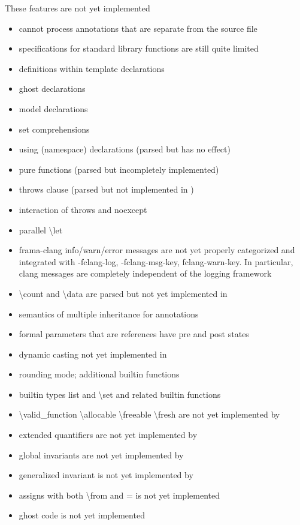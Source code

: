 These \acslpp features are not yet implemented
\begin{itemize}

\item \fclang cannot process annotations that are separate from the source file
\item \acslpp specifications for standard \cpp library functions are still quite limited
\item \acslpp definitions within template declarations
\item ghost declarations
\item model declarations
\item set comprehensions
\item using (namespace) declarations (parsed but has no effect)
\item pure functions (parsed but incompletely implemented)
\item throws clause (parsed but not implemented in \framac)
\item interaction of throws and noexcept
\item parallel \textbackslash let
\item frama-clang info/warn/error messages are not yet properly categorized and integrated with -fclang-log, -fclang-msg-key, fclang-warn-key. In particular, clang messages are completely independent of the \framac logging framework
\item \textbackslash count and \textbackslash data are parsed but not yet implemented in \framac
\item semantics of multiple inheritance for annotations
\item formal parameters that are references have pre and post states
\item dynamic casting not yet implemented in \framac
\item rounding mode; additional builtin functions
\item builtin types list and \textbackslash set and related builtin functions
\item \textbackslash valid\_function \textbackslash allocable \textbackslash freeable \textbackslash fresh are not yet implemented by \framac
\item extended quantifiers are not yet implemented by \framac
\item global invariants are not yet implemented by \framac
\item generalized invariant is not yet implemented by \framac
\item assigns with both \textbackslash from and = is not yet implemented
\item ghost code is not yet implemented

\end{itemize}

